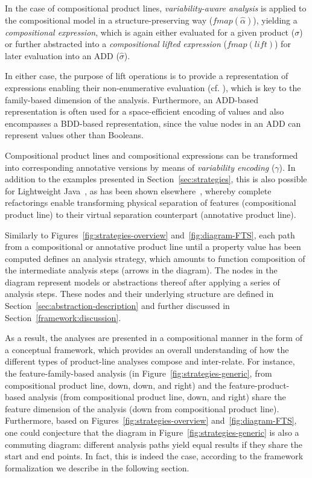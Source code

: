In the case of compositional product lines, \textit{variability-aware analysis} is applied to the compositional model in a structure-preserving 
way ($\mathit{fmap(\hat{\alpha})}$), yielding a \textit{compositional expression}, which is again either evaluated for a given product ($\sigma$) or further abstracted into a \textit{compositional lifted expression} ($\mathit{fmap(lift)}$) for later evaluation into an ADD ($\hat{\sigma}$). 

In either case, the purpose of lift operations is to provide a representation of expressions enabling their non-enumerative evaluation (cf. ), which is key to the family-based dimension of the analysis.
Furthermore, an ADD-based representation is often used for a space-efficient encoding of values and also encompasses a BDD-based representation, since the value nodes in an ADD can represent values other than Booleans. 

Compositional product lines and compositional expressions can be transformed into corresponding annotative versions by means of \textit{variability encoding} ($\gamma$). In addition to the examples presented in Section~\ref{sec:strategies}, this is also possible for Lightweight Java~\cite{LJava}, as has been shown elsewhere~\cite{gamaLJ}, whereby complete refactorings enable transforming physical separation of features (compositional product line) to their virtual separation counterpart (annotative product line).



Similarly to Figures~\ref{fig:strategies-overview} and~\ref{fig:diagram-FTS}, each path from a compositional or annotative product line until a property value has been computed defines an analysis strategy, which amounts to function composition of the intermediate analysis steps (arrows in the diagram). The nodes in the diagram represent models or abstractions thereof after applying a series of analysis steps. 
These nodes and their underlying structure are defined in Section~\ref{sec:abstraction-description} and further discussed in Section~\ref{framework:discussion}.

As a result, the analyses are presented in a compositional manner in the form of a conceptual framework, 
which provides an overall understanding of how the different types of product-line analyses compose 
and inter-relate.  For instance, the feature-family-based analysis (in Figure~\ref{fig:strategies-generic}, 
from compositional product line, down, down, and right) and the feature-product-based analysis (from compositional product line, 
down, and right) share the feature dimension of the analysis (down from compositional product line). 
Furthermore, based on Figures~\ref{fig:strategies-overview} and~\ref{fig:diagram-FTS}, one could conjecture that the diagram in Figure~\ref{fig:strategies-generic} is also a  commuting diagram: different analysis paths yield equal results if they share the start and end points. In fact, this is indeed the case, according to the framework formalization we describe in the following section. %



